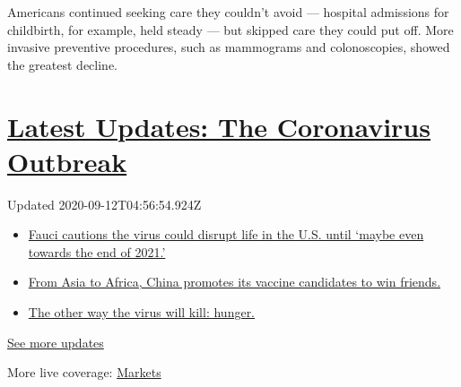 Americans continued seeking care they couldn't avoid --- hospital
admissions for childbirth, for example, held steady --- but skipped care
they could put off. More invasive preventive procedures, such as
mammograms and colonoscopies, showed the greatest decline.

\hypertarget{latest-updates-the-coronavirus-outbreak}{%
\section{\texorpdfstring{\href{https://www.nytimes3xbfgragh.onion/2020/09/11/world/covid-19-coronavirus.html?action=click\&pgtype=Article\&state=default\&region=MAIN_CONTENT_1\&context=storylines_live_updates}{Latest
Updates: The Coronavirus
Outbreak}}{Latest Updates: The Coronavirus Outbreak}}\label{latest-updates-the-coronavirus-outbreak}}

Updated 2020-09-12T04:56:54.924Z

\begin{itemize}
\tightlist
\item
  \href{https://www.nytimes3xbfgragh.onion/2020/09/11/world/covid-19-coronavirus.html?action=click\&pgtype=Article\&state=default\&region=MAIN_CONTENT_1\&context=storylines_live_updates\#link-dfb8a16}{Fauci
  cautions the virus could disrupt life in the U.S. until `maybe even
  towards the end of 2021.'}
\item
  \href{https://www.nytimes3xbfgragh.onion/2020/09/11/world/covid-19-coronavirus.html?action=click\&pgtype=Article\&state=default\&region=MAIN_CONTENT_1\&context=storylines_live_updates\#link-7104d154}{From
  Asia to Africa, China promotes its vaccine candidates to win friends.}
\item
  \href{https://www.nytimes3xbfgragh.onion/2020/09/11/world/covid-19-coronavirus.html?action=click\&pgtype=Article\&state=default\&region=MAIN_CONTENT_1\&context=storylines_live_updates\#link-393ad215}{The
  other way the virus will kill: hunger.}
\end{itemize}

\href{https://www.nytimes3xbfgragh.onion/2020/09/11/world/covid-19-coronavirus.html?action=click\&pgtype=Article\&state=default\&region=MAIN_CONTENT_1\&context=storylines_live_updates}{See
more updates}

More live coverage:
\href{https://www.nytimes3xbfgragh.onion/live/2020/09/11/business/stock-market-today-coronavirus?action=click\&pgtype=Article\&state=default\&region=MAIN_CONTENT_1\&context=storylines_live_updates}{Markets}

